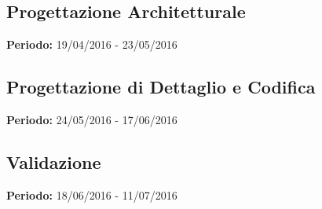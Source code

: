 \subsection{Progettazione Architetturale}
\textbf{Periodo:} 19/04/2016 - 23/05/2016\\

\subsection{Progettazione di Dettaglio e Codifica}
\textbf{Periodo:} 24/05/2016 - 17/06/2016\\

\subsection{Validazione}
\textbf{Periodo:} 18/06/2016 - 11/07/2016\\